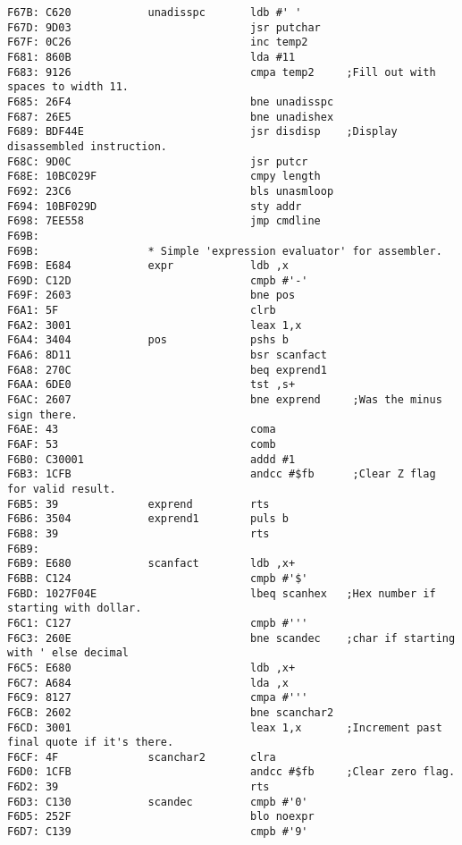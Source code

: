 {\begin{verbatim}
F67B: C620            unadisspc       ldb #' '
F67D: 9D03                            jsr putchar
F67F: 0C26                            inc temp2
F681: 860B                            lda #11
F683: 9126                            cmpa temp2     ;Fill out with spaces to width 11.
F685: 26F4                            bne unadisspc
F687: 26E5                            bne unadishex
F689: BDF44E                          jsr disdisp    ;Display disassembled instruction.
F68C: 9D0C                            jsr putcr
F68E: 10BC029F                        cmpy length
F692: 23C6                            bls unasmloop
F694: 10BF029D                        sty addr
F698: 7EE558                          jmp cmdline
F69B:                 
F69B:                 * Simple 'expression evaluator' for assembler.
F69B: E684            expr            ldb ,x
F69D: C12D                            cmpb #'-'
F69F: 2603                            bne pos
F6A1: 5F                              clrb
F6A2: 3001                            leax 1,x
F6A4: 3404            pos             pshs b
F6A6: 8D11                            bsr scanfact
F6A8: 270C                            beq exprend1
F6AA: 6DE0                            tst ,s+
F6AC: 2607                            bne exprend     ;Was the minus sign there.
F6AE: 43                              coma
F6AF: 53                              comb
F6B0: C30001                          addd #1
F6B3: 1CFB                            andcc #$fb      ;Clear Z flag for valid result.
F6B5: 39              exprend         rts             
F6B6: 3504            exprend1        puls b
F6B8: 39                              rts
F6B9:                 
F6B9: E680            scanfact        ldb ,x+
F6BB: C124                            cmpb #'$'
F6BD: 1027F04E                        lbeq scanhex   ;Hex number if starting with dollar.
F6C1: C127                            cmpb #'''
F6C3: 260E                            bne scandec    ;char if starting with ' else decimal
F6C5: E680                            ldb ,x+
F6C7: A684                            lda ,x
F6C9: 8127                            cmpa #'''
F6CB: 2602                            bne scanchar2
F6CD: 3001                            leax 1,x       ;Increment past final quote if it's there.
F6CF: 4F              scanchar2       clra
F6D0: 1CFB                            andcc #$fb     ;Clear zero flag.
F6D2: 39                              rts
F6D3: C130            scandec         cmpb #'0'
F6D5: 252F                            blo noexpr
F6D7: C139                            cmpb #'9'

\end{verbatim}}
